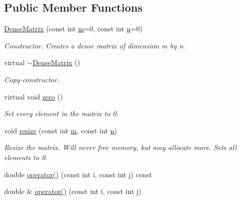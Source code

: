 \subsection*{Public Member Functions}
\begin{DoxyCompactItemize}
\item 
\mbox{\hyperlink{classfemus_1_1_dense_matrix_a5f0562386636a86cea485eca2df4780d}{Dense\+Matrix}} (const int \mbox{\hyperlink{classfemus_1_1_dense_matrix_base_a67a582a53ab5ce7628a53f6a90fd39b9}{m}}=0, const int \mbox{\hyperlink{classfemus_1_1_dense_matrix_base_a1d9b513340794a8b15640f9c8cc6597e}{n}}=0)
\begin{DoxyCompactList}\small\item\em Constructor. Creates a dense matrix of dimension {\ttfamily m} by {\ttfamily n}. \end{DoxyCompactList}\item 
virtual \mbox{\hyperlink{classfemus_1_1_dense_matrix_a641288aa079e581caa61a8ca9ebfc8f9}{$\sim$\+Dense\+Matrix}} ()
\begin{DoxyCompactList}\small\item\em Copy-\/constructor. \end{DoxyCompactList}\item 
virtual void \mbox{\hyperlink{classfemus_1_1_dense_matrix_a865963674763716d720d6ef2c8177053}{zero}} ()
\begin{DoxyCompactList}\small\item\em Set every element in the matrix to 0. \end{DoxyCompactList}\item 
void \mbox{\hyperlink{classfemus_1_1_dense_matrix_a590507fcb543e7ac922099af9b066a38}{resize}} (const int \mbox{\hyperlink{classfemus_1_1_dense_matrix_base_a67a582a53ab5ce7628a53f6a90fd39b9}{m}}, const int \mbox{\hyperlink{classfemus_1_1_dense_matrix_base_a1d9b513340794a8b15640f9c8cc6597e}{n}})
\begin{DoxyCompactList}\small\item\em Resize the matrix. Will never free memory, but may allocate more. Sets all elements to 0. \end{DoxyCompactList}\item 
double \mbox{\hyperlink{classfemus_1_1_dense_matrix_a17c69f52638c4df03c15a6724e537ebf}{operator()}} (const int i, const int j) const
\item 
double \& \mbox{\hyperlink{classfemus_1_1_dense_matrix_a2ca6e78e2fc5c583bc60f210d79ba28d}{operator()}} (const int i, const int j)
\item 

\end{DoxyCompactItemize}
